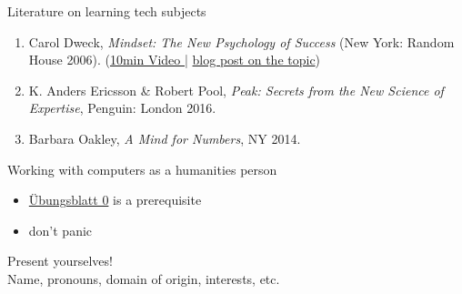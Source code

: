 \begin{frame}{Literature on learning tech subjects}

\begin{enumerate}
    \item Carol Dweck, \emph{Mindset: The New Psychology of Success} (New York: Random House 2006). {\footnotesize (\href{https://www.youtube.com/watch?v=hiiEeMN7vbQ}{10min Video } | \href{https://latex-ninja.com/2021/06/21/the-most-important-book-to-read-if-you-want-to-learn-digital-humanities-computer-science-maths-programming-or-latex/}{blog post on the topic}) }
    \item K. Anders Ericsson \& Robert Pool, \emph{Peak: Secrets from the New Science of Expertise}, Penguin: London 2016. 
    \item Barbara Oakley, \emph{A Mind for Numbers}, NY 2014.
\end{enumerate}

\end{frame}
\begin{frame}{Working with computers as a humanities person}

\begin{itemize}
    \item \href{https://static.uni-graz.at/fileadmin/gewi-zentren/Informationsmodellierung/PDF/U__bungsblatt-0.pdf}{Übungsblatt 0} is a prerequisite
    \item don't panic
\end{itemize}
    
\end{frame}

\begin{frame}[standout]
    \alert{Present yourselves! } \\
    Name, pronouns, domain of origin, interests, etc.
\end{frame}


